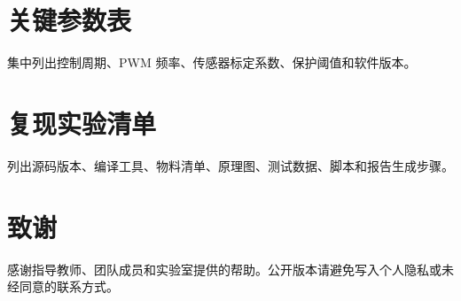\documentclass[12pt,a4paper,fontset=fandol,oneside,openany]{ctexbook}
\begin{document}
\appendix
\chapter{关键参数表}
集中列出控制周期、PWM 频率、传感器标定系数、保护阈值和软件版本。

\chapter{复现实验清单}
列出源码版本、编译工具、物料清单、原理图、测试数据、脚本和报告生成步骤。

\backmatter
\printbibliography[heading=bibintoc]

\chapter*{致谢}
感谢指导教师、团队成员和实验室提供的帮助。公开版本请避免写入个人隐私或未经同意的联系方式。
\end{document}

